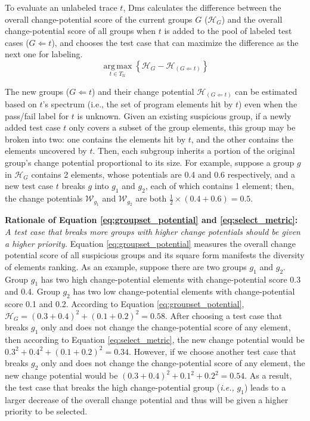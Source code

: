 To evaluate an unlabeled trace $t$, {\sc Dms} calculates the difference between the overall change-potential score of the current groups $G$ ($\mathcal{H}_G$) and the overall change-potential score of all groups when $t$ is added to the pool of labeled test cases ($G \Leftarrow t$), and chooses the test case that can maximize the difference as the next one for labeling.
\begin{equation}
	\operatorname*{arg\,max}_{t \in T_\mathcal{U}} \left\{ \mathcal{H}_G - \mathcal{H}_{(G \Leftarrow t)} \right\}\label{eq:select_metric}
\end{equation}

The new groups ($G \Leftarrow t$) and their change potential $\mathcal{H}_{(G \Leftarrow t)}$ can be estimated based on $t$'s spectrum (i.e., the set of program elements hit by $t$) even when the pass/fail label for $t$ is unknown. Given an existing suspicious group, if a newly added test case $t$ only covers a subset of the group elements, this group may be broken into two: one contains the elements hit by $t$, and the other contains the elements uncovered by $t$. Then, each subgroup inherits a portion of the original group's change potential proportional to its size. For example, suppose a group $g$ in $\mathcal{H}_{G}$ contains 2 elements, whose potentials are 0.4 and 0.6 respectively, and a new test case $t$ breaks $g$ into $g_{1}$ and $g_{2}$, each of which contains 1 element; then, the change potentials $\mathcal{W}_{g_1}$ and $\mathcal{W}_{g_2}$ are both $\frac{1}{2}\times(0.4+0.6) = 0.5$.

\noindent\textbf{Rationale of Equation \ref{eq:groupset_potential} and \ref{eq:select_metric}:} \textit{A test case that breaks more groups with higher change potentials should be given a higher priority.}
Equation \ref{eq:groupset_potential} measures the overall change potential score of all suspicious groups and its square form manifests the diversity of elements ranking.
As an example, suppose there are two groups $g_{1}$ and $g_{2}$. Group $g_1$ has two high change-potential elements with change-potential score 0.3 and 0.4.
Group $g_{2}$ has two low change-potential elements with change-potential score 0.1 and 0.2.
According to Equation \ref{eq:groupset_potential}, $\mathcal{H}_G = (0.3+0.4)^{2} + (0.1 + 0.2)^2 = 0.58$. After choosing a test case that breaks $g_1$ only and does not change the change-potential score of any element, then according to Equation \ref{eq:select_metric}, the new change potential would be $0.3^{2} + 0.4^{2} + (0.1 + 0.2)^2 = 0.34$. However, if we choose another test case that breaks $g_{2}$ only and does not change the change-potential score of any element, the new change potential would be $ (0.3+0.4)^{2} + 0.1^{2} + 0.2^{2} = 0.54$. As a result, the test case that breaks the high change-potential group (\textit{i.e.,} $g_{1}$) leads to a larger decrease of the overall change potential and thus will be given a higher priority to be selected.

